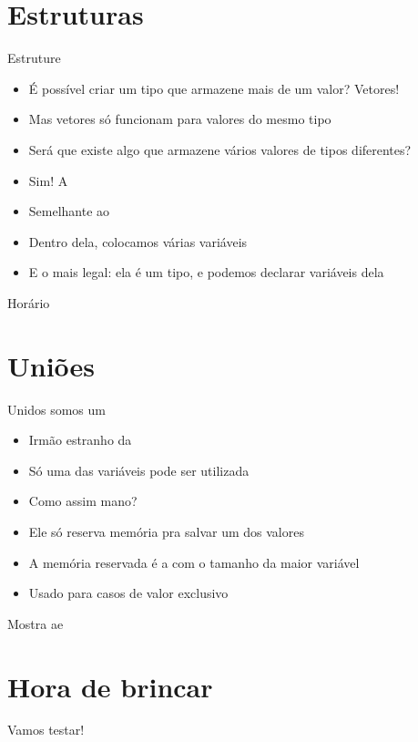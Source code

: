 \documentclass[14pt]{beamer}
\begin{document}
	\section{Estruturas}
		\begin{frame}{Estruture}
			\begin{itemize}
				\presentationPause\item É possível criar um tipo que armazene mais de um valor? \presentationPause Vetores!
				\presentationPause\item Mas vetores só funcionam para valores do mesmo tipo
				\presentationPause\item Será que existe algo que armazene vários valores de tipos diferentes?
				\presentationPause\item Sim! \presentationPause A 
				\presentationPause\item Semelhante ao 
				\presentationPause\item Dentro dela, colocamos várias variáveis
				\presentationPause\item E o mais legal: \presentationPause ela é um tipo, e podemos declarar variáveis dela
			\end{itemize}
			\presentationPause
		\end{frame}

		\begin{frame}{Horário}
			\presentationPause
		\end{frame}
		
	\section{Uniões}
		\begin{frame}{Unidos somos um}
			\begin{itemize}
				\presentationPause\item Irmão estranho da 
				\presentationPause\item Só uma das variáveis pode ser utilizada
				\presentationPause\item Como assim mano?
				\presentationPause\item Ele só reserva memória pra salvar um dos valores
				\presentationPause\item A memória reservada é a com o tamanho da maior variável
				\presentationPause\item Usado para casos de valor exclusivo
			\end{itemize}
			\presentationPause
		\end{frame}

		\begin{frame}{Mostra ae}
			\presentationPause
		\end{frame}

	\section{Hora de brincar}
		\begin{frame}
			\begin{center}\Huge
				Vamos testar!
			\end{center}
		\end{frame}

	
\end{document}
